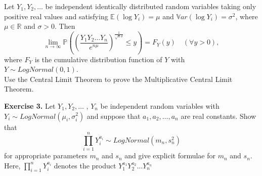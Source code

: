 \documentclass[11pt,a4paper]{report}
\begin{document}
Let $Y_1, Y_2,\ldots $ be independent identically distributed random variables taking only positive real values and satisfying $\mathbb{E}(\log Y_i) = \mu$ and $\mathbb{V}ar(\log Y_i) = \sigma^2$, where $\mu \in \mathbb{R}$ and $\sigma > 0$. Then $$\lim_{n\to \infty}\mathbb{P}\left(\left(\frac{Y_1Y_2\ldots Y_n}{e^{n\mu}}\right)^{\frac{1}{\sqrt{n}\sigma}}\leq y\right)=F_Y(y)\quad (\forall y>0),$$ where $F_Y$ is the cumulative distribution function of $Y$ with $Y \sim LogNormal(0, 1)$.\\
Use the Central Limit Theorem to prove the Multiplicative Central Limit Theorem.\par
\textbf{Exercise 3.} Let $Y_1, Y_2, \ldots$ , $Y_n$ be independent random variables with $Y_i\sim LogNormal(\mu_i, \sigma^2_i)$ and suppose that $a_1, a_2, \ldots , a_n$ are real constants. Show that $$\prod_{i=1}^nY_i^{a_i}\sim LogNormal(m_n, s_n^2) $$
for appropriate parameters $m_n$ and $s_n$ and give explicit formulae for $m_n$ and $s_n$. Here, $\prod_{i=1}^nY_i^{a_i}$ denotes the product $Y_1^{a_1}Y_2^{a_2}\ldots Y_n^{a_n}$
\end{document}
